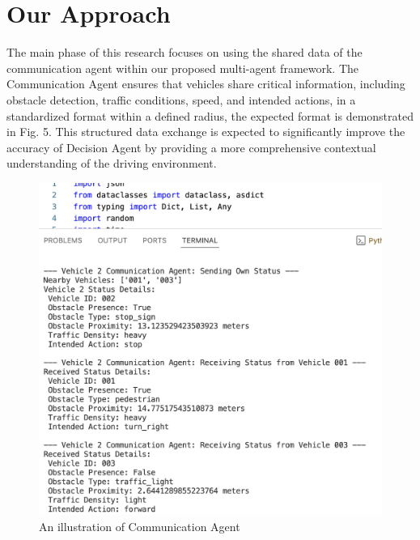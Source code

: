 \documentclass[conference]{IEEEtran}
\begin{document}
 

 


\section{Our Approach}
The main phase of this research focuses on using the shared data of the communication agent within our proposed multi-agent framework. The Communication Agent ensures that vehicles share critical information, including obstacle detection, traffic conditions, speed, and intended actions, in a standardized format within a defined radius, the expected format is demonstrated in Fig. 5. This structured data exchange is expected to significantly improve the accuracy of Decision Agent by providing a more comprehensive contextual understanding of the driving environment.
 \begin{figure}[!ht]
     \centering
     \includegraphics[width=\linewidth]{Fig/Commu_Agent.png}
     \caption{An illustration of Communication Agent}
     \label{fig:enter-label}
 \end{figure} 
\end{document}
